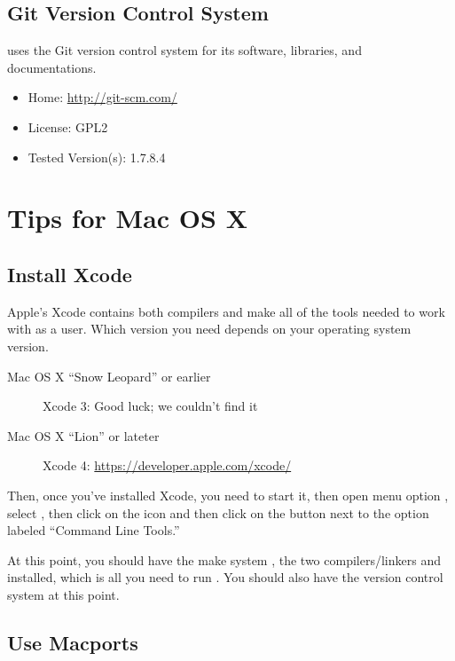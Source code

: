 \subsection{Git Version Control System}

\Stan uses the Git version control system for its software, libraries,
and documentations.  
% 
\begin{itemize}
\item Home: \url{http://git-scm.com/}
\item License: GPL2
\item Tested Version(s): 1.7.8.4
\end{itemize}



\section{Tips for Mac OS X}

\subsection{Install Xcode}

Apple's Xcode contains both compilers and make all of the tools needed 
to work with \Stan as a user.  Which version you need depends on your
operating system version.

\begin{description}
\item[Mac OS X ``Snow Leopard'' or earlier]
Xcode 3: Good luck; we couldn't find it
\item[Mac OS X ``Lion'' or lateter]
Xcode 4: \url{https://developer.apple.com/xcode/}
\end{description}

Then, once you've installed Xcode, you need to start it, then open
menu option , select , then click on the
 icon and then click on the  button next
to the option labeled ``Command Line Tools.''

At this point, you should have the make system , the two
\Cpp compilers/linkers \gpp and \clang installed, which
is all you need to run \Stan.  You should also have the 
version control system at this point.

\subsection{Use Macports}

